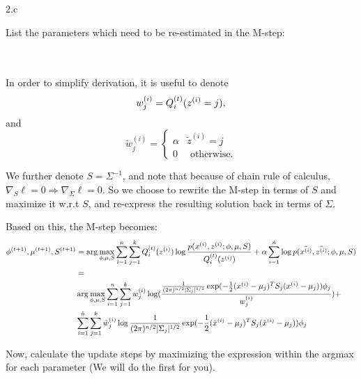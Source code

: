 \LARGE
2.c
\normalsize

  \begin{answer}
    List the parameters which need to be re-estimated in the M-step:\\\\\\

    \allowdisplaybreaks

    In order to simplify derivation, it is useful to denote $$w_j^{(i)} = Q^{(t)}_i(z^{(i)}=j),$$ and $$\tilde{w}_j^{(i)} = \begin{cases} \alpha & \tilde{z}^{(i)} = j \\ 0 & \text{ otherwise.} \end{cases}$$

    We further denote $S = \Sigma^{-1}$, and note that because of chain rule of calculus, $\nabla_S\ell = 0 \Rightarrow \nabla_\Sigma \ell = 0$. So we choose to rewrite the M-step in terms of $S$ and maximize it w.r.t $S$, and re-express the resulting solution back in terms of $\Sigma$.

    Based on this, the M-step becomes:
    \begin{align*}
    \phi^{(t+1)}, \mu^{(t+1)}, S^{(t+1)} &=  \arg\max_{\phi,\mu,S} \sum_{i=1}^{n} \sum_{j=1}^k Q_i^{(t)}(z^{(i)}) \log \frac{p(x^{(i)},z^{(i)};\phi,\mu,S)}{Q_i^{(t)}(z^{(i)})} + \alpha \sum_{i=1}^{\tilde{{n}}} \log p(\tilde{x^{(i)}}, \tilde{z^{(i)}}; \phi, \mu, S)\\
    &=\\
     &  \arg\max_{\phi,\mu,S} \sum_{i=1}^{n} \sum_{j=1}^k w^{(i)}_j \log (\frac{  \frac{1}{(2\pi)^{n/2}\vert\Sigma_j\vert^{1/2}} \exp(-\frac{1}{2}(x^{(i)} - \mu_j)^T S_j(x^{(i)} - \mu_j))\phi_j}{w^{(i)}_j}) + \\ &  \sum_{i=1}^{\tilde{{n}}}\sum_{j=1}^k \tilde{w}^{(i)}_j \log \frac{1}{(2\pi)^{n/2}\vert\Sigma_j\vert^{1/2}} \exp(-\frac{1}{2}(\tilde{x}^{(i)} - \mu_j)^T S_j (\tilde{x}^{(i)} - \mu_j))\phi_j \\
    \end{align*}

    Now, calculate the update steps by maximizing the expression within the argmax for each parameter (We will do the first for you).


\end{answer}
